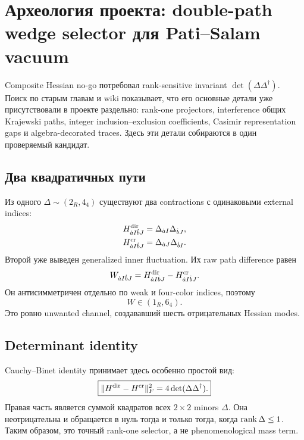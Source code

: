 \chapter{Археология проекта: double-path wedge selector для Pati--Salam vacuum}

Composite Hessian no-go потребовал rank-sensitive invariant
\(\det(\Delta\Delta^\dagger)\). Поиск по старым главам и wiki показывает,
что его основные детали уже присутствовали в проекте раздельно:
rank-one projectors, interference общих Krajewski paths, integer
inclusion--exclusion coefficients, Casimir representation gaps и
algebra-decorated traces. Здесь эти детали собираются в один проверяемый
кандидат.

\section{Два квадратичных пути}

Из одного \(\Delta\sim(2_R,4_4)\) существуют два contractions с одинаковыми
external indices:
\begin{align}
 H^{\rm dir}_{\dot aI\dot bJ}
 &=\Delta_{\dot aI}\Delta_{\dot bJ},\\
 H^{\rm cr}_{\dot aI\dot bJ}
 &=\Delta_{\dot aJ}\Delta_{\dot bI}.
\end{align}
Второй уже выведен generalized inner fluctuation. Их raw path difference
равен
\begin{equation}
 W_{\dot aI\dot bJ}
 =H^{\rm dir}_{\dot aI\dot bJ}
 -H^{\rm cr}_{\dot aI\dot bJ}.
\end{equation}
Он антисимметричен отдельно по weak и four-color indices, поэтому
\begin{equation}
 W\in(1_R,6_4).
\end{equation}
Это ровно unwanted channel, создававший шесть отрицательных Hessian modes.

\section{Determinant identity}

Cauchy--Binet identity принимает здесь особенно простой вид:
\begin{equation}
 \boxed{
 \|H^{\rm dir}-H^{\rm cr}\|_F^2
 =4\det(\Delta\Delta^\dagger).}
 \label{eq:ps-double-path-determinant}
\end{equation}
Правая часть является суммой квадратов всех \(2\times2\) minors
\(\Delta\). Она неотрицательна и обращается в нуль тогда и только тогда,
когда \(\operatorname{rank}\Delta\le1\). Таким образом, это точный rank-one selector, а
не phenomenological mass term.

